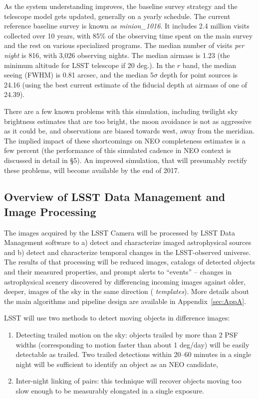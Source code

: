 As the system understanding improves, the baseline survey strategy and the telescope model 
gets updated, generally on a yearly schedule. The current reference baseline survey is known 
as {\it minion\_1016}. It includes 2.4
million visits collected over 10 years, with 85\% of the observing time spent on the 
main survey and the rest on various specialized programs. The median number of visits
{\it per night} is 816, with 3,026 observing nights. The median airmass is 1.23 (the
minimum altitude for LSST telescope if 20 deg.). In the $r$ band, the median seeing 
(FWHM) is 0.81 arcsec, and the median $5\sigma$ depth for point sources is 24.16 
(using the best current estimate of the fiducial depth at airmass of one of 24.39). 

There are a few known problems with this simulation, including twilight sky brightness
estimates that are too bright, the moon avoidance is not as aggressive as it could be,
and observations are biased towards west, away from the meridian. The implied impact
of these shortcomings on NEO completeness estimates is a few percent (the performance 
of this simulated cadence in NEO context is discussed in detail in \S5). An improved simulation, 
that will presumably rectify these problems, will become available by the end of 2017. 


\subsection{Overview of LSST  Data Management and Image Processing} 

The images acquired by the LSST Camera will be processed by LSST Data Management
software \citep{juric15} to a) detect and characterize imaged
astrophysical sources and b) detect and characterize temporal changes
in the LSST-observed universe. The results of that processing will be
reduced images, catalogs of detected objects and their measured properties, and 
prompt alerts to ``events'' -- changes in astrophysical scenery discovered by differencing 
incoming images against older, deeper, images of the sky in the same direction ({\em
templates}). More details about the main algorithms and pipeline design are available
in Appendix~\ref{sec:AppA}. 

LSST will use two methods to detect moving objects in difference images: 
\begin{enumerate}
\item Detecting trailed motion on the sky: objects trailed by more
  than 2 PSF widths (corresponding to motion faster than about 1
  deg/day) will be easily detectable as trailed.  Two trailed
  detections within 20--60 minutes in a single night will be
  sufficient to identify an object as an NEO candidate,
\item Inter-night linking of pairs: this technique will recover
  objects moving too slow enough to be measurably elongated in 
  a single exposure. 
\end{enumerate} 


